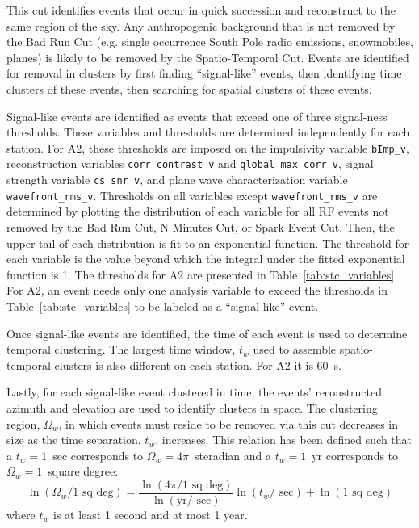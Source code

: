     This cut identifies events that occur in quick succession and reconstruct to the same region of the sky. 
    Any anthropogenic background that is not removed by the Bad Run Cut (e.g. single occurrence South Pole radio emissions, snowmobiles, planes) is likely to be removed by the Spatio-Temporal Cut. 
    Events are identified for removal in clusters by first finding ``signal-like'' events, then identifying time clusters of these events, then searching for spatial clusters of these events.

    Signal-like events are identified as events that exceed one of three signal-ness thresholds.
    These variables and thresholds are determined independently for each station. 
    For A2, these thresholds are imposed on the impulsivity variable \texttt{bImp\_v}, reconstruction variables \texttt{corr\_contrast\_v} and \texttt{global\_max\_corr\_v}, signal strength variable \texttt{cs\_snr\_v}, and plane wave characterization variable \texttt{wavefront\_rms\_v}.
    Thresholds on all variables except \texttt{wavefront\_rms\_v} are determined by plotting the distribution of each variable for all RF events not removed by the Bad Run Cut, N Minutes Cut, or Spark Event Cut.
    Then, the upper tail of each distribution is fit to an exponential function.
    The threshold for each variable is the value beyond which the integral under the fitted exponential function is 1.
    The thresholds for A2 are presented in Table~\ref{tab:stc_variables}.
    For A2, an event needs only one analysis variable to exceed the thresholds in Table~\ref{tab:stc_variables} to be labeled as a ``signal-like'' event.

    Once signal-like events are identified, the time of each event is used to determine temporal clustering. 
    The largest time window, $t_w$ used to assemble spatio-temporal clusters is also different on each station.
    For A2 it is 60~s. 

    Lastly, for each signal-like event clustered in time, the events' reconstructed azimuth and elevation are used to identify clusters in space. 
    The clustering region, $\Omega_w$, in which events must reside to be removed via this cut decreases in size as the time separation, $t_w$, increases.
    This relation has been defined such that a $t_w=1$~sec corresponds to $\Omega_w=4\pi$~steradian and a $t_w=1$~yr corresponds to $\Omega_w=1$~square degree:
    \begin{equation}
      \ln(\Omega_w / 1 \text{ sq deg})= \frac{\ln(4\pi / 1 \text{ sq deg})}{\ln(\text{yr}/\text{ sec})} \ln(t_w / \text{ sec}) + \ln( 1 \text{ sq deg})
      \label{eq:stc_angularsize}
    \end{equation}
    where $t_w$ is at least 1 second and at most 1 year.

